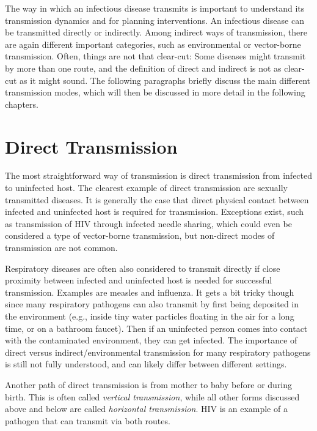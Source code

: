 \documentclass[]{book}
\theoremstyle{definition}
\theoremstyle{definition}
\theoremstyle{definition}
\theoremstyle{remark}
\begin{document}
The way in which an infectious disease transmits is important to
understand its transmission dynamics and for planning interventions. An
infectious disease can be transmitted directly or indirectly. Among
indirect ways of transmission, there are again different important
categories, such as environmental or vector-borne transmission. Often,
things are not that clear-cut: Some diseases might transmit by more than
one route, and the definition of direct and indirect is not as clear-cut
as it might sound. The following paragraphs briefly discuss the main
different transmission modes, which will then be discussed in more
detail in the following chapters.

\hypertarget{direct-transmission}{%
\section{Direct Transmission}\label{direct-transmission}}

The most straightforward way of transmission is direct transmission from
infected to uninfected host. The clearest example of direct transmission
are sexually transmitted diseases. It is generally the case that direct
physical contact between infected and uninfected host is required for
transmission. Exceptions exist, such as transmission of HIV through
infected needle sharing, which could even be considered a type of
vector-borne transmission, but non-direct modes of transmission are not
common.

Respiratory diseases are often also considered to transmit directly if
close proximity between infected and uninfected host is needed for
successful transmission. Examples are measles and influenza. It gets a
bit tricky though since many respiratory pathogens can also transmit by
first being deposited in the environment (e.g., inside tiny water
particles floating in the air for a long time, or on a bathroom faucet).
Then if an uninfected person comes into contact with the contaminated
environment, they can get infected. The importance of direct versus
indirect/environmental transmission for many respiratory pathogens is
still not fully understood, and can likely differ between different
settings.

Another path of direct transmission is from mother to baby before or
during birth. This is often called \emph{vertical transmission}, while
all other forms discussed above and below are called \emph{horizontal
transmission}. HIV is an example of a pathogen that can transmit via
both routes.
\end{document}

